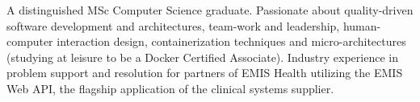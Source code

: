 \begin{cvparagraph}

A distinguished MSc Computer Science graduate. Passionate about quality-driven software development and architectures, team-work and leadership, human-computer interaction design, containerization techniques and micro-architectures (studying at leisure to be a Docker Certified Associate). Industry experience in problem support and resolution for partners of EMIS Health utilizing the EMIS Web API, the flagship application of the clinical systems supplier.   
\end{cvparagraph}
